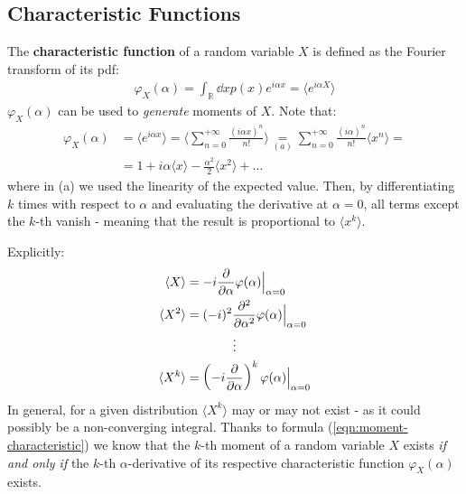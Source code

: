 \documentclass[../template.tex]{subfiles}
\begin{document}
\subsection{Characteristic Functions}
The \textbf{characteristic function} of a random variable $X$ is defined as the Fourier transform of its pdf:
\begin{align}\label{eqn:char-func}
    \varphi_X(\alpha) = \int_{\mathbb{R}} \dd{x} p(x) e^{i \alpha x} = \langle e^{i \alpha X} \rangle
\end{align}  
$\varphi_X(\alpha)$ can be used to \textit{generate} moments of $X$. Note that:
\begin{align*}
    \varphi_X(\alpha) &= \langle e^{i \alpha x} \rangle = \langle \sum_{n=0}^{+\infty} \frac{(i \alpha x)^n}{n!} \rangle \underset{(a)}{=} \sum_{n=0}^{+\infty} \frac{(i \alpha)^n}{n!} \langle x^n \rangle  =\\
    &= 1 + i \alpha \langle x \rangle - \frac{\alpha^2}{2} \langle x^2 \rangle + \dots  
\end{align*}
where in (a) we used the linearity of the expected value. Then, by differentiating $k$ times with respect to $\alpha$ and evaluating the derivative at $\alpha = 0$, all terms except the $k$-th vanish - meaning that the result is proportional to $\langle x^k \rangle$.

Explicitly:
\begin{align}\nonumber 
    \langle X \rangle &= -i \pdv{\alpha} \varphi(\alpha) \Big|_{\alpha = 0}\\
    \langle X^2 \rangle &= (-i)^2 \pdv[2]{\alpha} \varphi(\alpha) \Big|_{\alpha = 0} \nonumber \\ \nonumber 
    \vdots \span\\ 
    \langle X^k \rangle &= \left(-i \pdv{\alpha}\right)^k \varphi(\alpha) \Big|_{\alpha = 0} \label{eqn:moment-characteristic}
\end{align}
In general, for a given distribution $\langle X^k \rangle$ may or may not exist - as it could possibly be a non-converging integral. Thanks to formula (\ref{eqn:moment-characteristic}) we know that the $k$-th moment of a random variable $X$ exists \textit{if and only if} the $k$-th $\alpha$-derivative of its respective characteristic function $\varphi_X(\alpha)$ exists.
\end{document}
